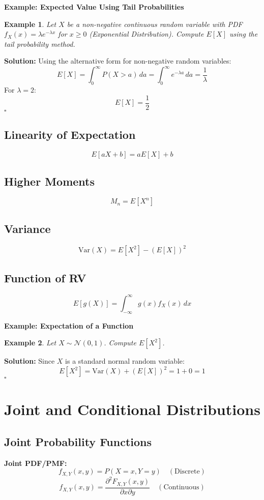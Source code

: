 \documentclass[12pt]{article}
\newtheorem{example}{Example}
\newenvironment{solution}{\noindent\textbf{Solution:}}{\hfill$\square$}
\begin{document}
\textbf{Example: Expected Value Using Tail Probabilities}
\begin{example}
Let \( X \) be a non-negative continuous random variable with PDF \( f_X(x) = \lambda e^{-\lambda x} \) for \( x \geq 0 \) (Exponential Distribution). Compute \( E[X] \) using the tail probability method.
\end{example}
\begin{solution}
Using the alternative form for non-negative random variables:
\[
E[X] = \int_0^{\infty} P(X > a) \, da = \int_0^{\infty} e^{-\lambda a} \, da = \frac{1}{\lambda}
\]
For \( \lambda = 2 \):
\[
E[X] = \frac{1}{2}
\]
\end{solution}

\subsection{Linearity of Expectation}
\[
E[aX + b] = aE[X] + b
\]

\subsection{Higher Moments}
\[
M_n = E[X^n]
\]

\subsection{Variance}
\[
\text{Var}(X) = E[X^2] - (E[X])^2
\]

\subsection{Function of RV}
\[
E[g(X)] = \int_{-\infty}^{\infty} g(x) f_X(x) \, dx
\]

\textbf{Example: Expectation of a Function}
\begin{example}
Let \( X \sim \mathcal{N}(0, 1) \). Compute \( E[X^2] \).
\end{example}
\begin{solution}
Since \( X \) is a standard normal random variable:
\[
E[X^2] = \text{Var}(X) + (E[X])^2 = 1 + 0 = 1
\]
\end{solution}

\section{Joint and Conditional Distributions}
\subsection{Joint Probability Functions}
\textbf{Joint PDF/PMF:}
\[
f_{X,Y}(x,y) = P(X=x, Y=y) \quad (\text{Discrete})
\]
\[
f_{X,Y}(x,y) = \frac{\partial^2 F_{X,Y}(x,y)}{\partial x \partial y} \quad (\text{Continuous})
\]
\end{document}
